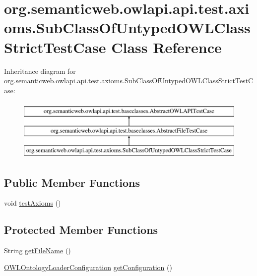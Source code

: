\hypertarget{classorg_1_1semanticweb_1_1owlapi_1_1api_1_1test_1_1axioms_1_1_sub_class_of_untyped_o_w_l_class_strict_test_case}{\section{org.\-semanticweb.\-owlapi.\-api.\-test.\-axioms.\-Sub\-Class\-Of\-Untyped\-O\-W\-L\-Class\-Strict\-Test\-Case Class Reference}
\label{classorg_1_1semanticweb_1_1owlapi_1_1api_1_1test_1_1axioms_1_1_sub_class_of_untyped_o_w_l_class_strict_test_case}
}
Inheritance diagram for org.\-semanticweb.\-owlapi.\-api.\-test.\-axioms.\-Sub\-Class\-Of\-Untyped\-O\-W\-L\-Class\-Strict\-Test\-Case\-:\begin{figure}[H]
\begin{center}
\leavevmode
\includegraphics[height=3.000000cm]{classorg_1_1semanticweb_1_1owlapi_1_1api_1_1test_1_1axioms_1_1_sub_class_of_untyped_o_w_l_class_strict_test_case}
\end{center}
\end{figure}
\subsection*{Public Member Functions}
\begin{DoxyCompactItemize}
\item 
void \hyperlink{classorg_1_1semanticweb_1_1owlapi_1_1api_1_1test_1_1axioms_1_1_sub_class_of_untyped_o_w_l_class_strict_test_case_abe91f34d0750c8a84d2712d585d8ca93}{test\-Axioms} ()
\end{DoxyCompactItemize}
\subsection*{Protected Member Functions}
\begin{DoxyCompactItemize}
\item 
String \hyperlink{classorg_1_1semanticweb_1_1owlapi_1_1api_1_1test_1_1axioms_1_1_sub_class_of_untyped_o_w_l_class_strict_test_case_a2cd7c68497a05065424248fc27762821}{get\-File\-Name} ()
\item 
\hyperlink{classorg_1_1semanticweb_1_1owlapi_1_1model_1_1_o_w_l_ontology_loader_configuration}{O\-W\-L\-Ontology\-Loader\-Configuration} \hyperlink{classorg_1_1semanticweb_1_1owlapi_1_1api_1_1test_1_1axioms_1_1_sub_class_of_untyped_o_w_l_class_strict_test_case_add7c2f470ae1ec32fe05bd1cc103f153}{get\-Configuration} ()
\end{DoxyCompactItemize}


